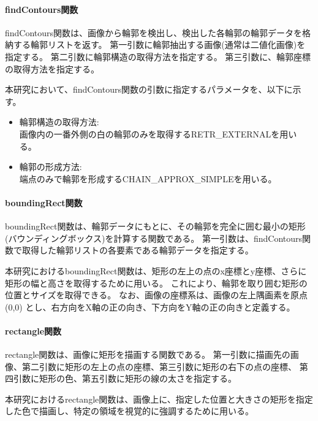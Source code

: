 \paragraph{findContours関数}
findContours関数は、画像から輪郭を検出し、検出した各輪郭の輪郭データを格納する輪郭リストを返す。
第一引数に輪郭抽出する画像(通常は二値化画像)を指定する。
第二引数に輪郭構造の取得方法を指定する。
第三引数に、輪郭座標の取得方法を指定する。
\par
本研究において、findContours関数の引数に指定するパラメータを、以下に示す。
\begin{itemize}
      \setlength{\itemsep}{0pt}
            \setlength{\parsep}{0pt}
      \item 輪郭構造の取得方法:\\
            画像内の一番外側の白の輪郭のみを取得するRETR\_EXTERNAL\cite{RetrExternal}を用いる。
      \item 輪郭の形成方法:\\
            端点のみで輪郭を形成するCHAIN\_APPROX\_SIMPLE\cite{ChainApproxSimple}を用いる。
\end{itemize}
\par
\paragraph{boundingRect関数}
boundingRect関数は、輪郭データにもとに、その輪郭を完全に囲む最小の矩形(バウンディングボックス)を計算する関数である。
第一引数は、findContours関数で取得した輪郭リストの各要素である輪郭データを指定する。
\par
本研究におけるboundingRect関数は、矩形の左上の点のx座標とy座標、さらに矩形の幅と高さを取得するために用いる。
これにより、輪郭を取り囲む矩形の位置とサイズを取得できる。
なお、画像の座標系は、画像の左上隅画素を原点 (0,0) とし、右方向をX軸の正の向き、下方向をY軸の正の向きと定義する。
\paragraph{rectangle関数}
rectangle関数は、画像に矩形を描画する関数である。
第一引数に描画先の画像、第二引数に矩形の左上の点の座標、第三引数に矩形の右下の点の座標、
第四引数に矩形の色、第五引数に矩形の線の太さを指定する。
\par
本研究におけるrectangle関数は、画像上に、指定した位置と大きさの矩形を指定した色で描画し、特定の領域を視覚的に強調するために用いる。
